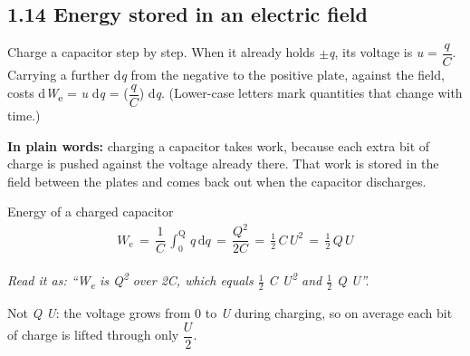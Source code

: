 \documentclass[11pt]{article}
\begin{document}
\begin{keepsection}
\section{1.14 Energy stored in an electric field}

Charge a capacitor step by step. When it already holds \ensuremath{\pm}\textit{q}, its voltage is \textit{u} = {\small\ensuremath{\dfrac{{q}}{{C}}}}. Carrying a further d\textit{q} from the negative to the positive plate, against the field, costs d\textit{W}\textsubscript{e} = \textit{u} d\textit{q} = ({\small\ensuremath{\dfrac{{q}}{{C}}}}) d\textit{q}. (Lower-case letters mark quantities that change with time.)

\begin{plainbox}\textbf{In plain words:} charging a capacitor takes work, because each extra bit of charge is pushed against the voltage already there. That work is stored in the field between the plates and comes back out when the capacitor discharges.\end{plainbox}

\begin{equationcard}{Energy of a charged capacitor}
\[ \begin{gathered} {W}_{\mathrm{e}}\, =\, \dfrac{1}{{C}}\, \int_{0}^{\mathrm{Q}} \, {q}\, \mathrm{d}{q}\, =\, \dfrac{{Q}^{2}}{2{C}}\, =\, \tfrac{1}{2}\, {C\,U}^{2}\, =\, \tfrac{1}{2}\, {Q\,U} \end{gathered} \]
{\small \emph{Read it as: “W\textsubscript{e} is Q\textsuperscript{2} over 2C, which equals \ensuremath{\tfrac12} C U\textsuperscript{2} and \ensuremath{\tfrac12} Q U”.}\par Not \textit{Q U}: the voltage grows from 0 to \textit{U} during charging, so on average each bit of charge is lifted through only {\small\ensuremath{\dfrac{{U}}{2}}}.}
\end{equationcard}


\end{keepsection}
\end{document}
